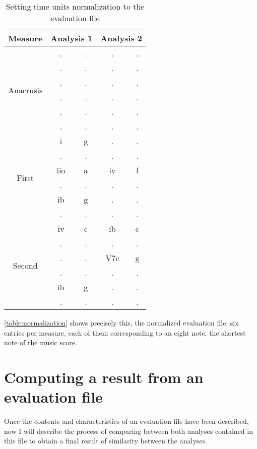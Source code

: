 		\begin{table}[tbp]
		\centering
		\begin{tabular}{|c|c|c|c|c|}
		\hline
		Measure & \multicolumn{2}{c|}{Analysis 1} & \multicolumn{2}{c|}{Analysis 2} \\ \hline
		\multirow{6}{*}{Anacrusis} & . & . & . & . \\ \cline{2-5}
		 & . & . & . & . \\ \cline{2-5}
		 & . & . & . & . \\ \cline{2-5}
		 & . & . & . & . \\ \cline{2-5}
		 & . & . & . & . \\ \cline{2-5}
		 & . & . & . & . \\ \hline
		\multirow{6}{*}{First} & i & g & . & . \\ \cline{2-5}
		 & . & . & . & . \\ \cline{2-5}
		 & iio & a & iv & f \\ \cline{2-5}
		 & . & . & . & . \\ \cline{2-5}
		 & ib & g & . & . \\ \cline{2-5}
		 & . & . & . & . \\ \hline
		\multirow{6}{*}{Second} & iv & c & ib & c \\ \cline{2-5}
		 & . & . & . & . \\ \cline{2-5}
		 & . & . & V7c & g \\ \cline{2-5}
		 & . & . & . & . \\ \cline{2-5}
		 & ib & g & . & . \\ \cline{2-5}
		 & . & . & . & . \\ \hline
		\end{tabular}
		\caption{Setting time units normalization to the evaluation file}
		\label{table:normalization}
		\end{table}

		\autoref{table:normalization} shows precisely this, the normalized evaluation file, six entries per measure, each of them corresponding to an eight note, the shortest note of the music score.

\section{Computing a result from an evaluation file}
	Once the contents and characteristics of an evaluation file have been described, now I will describe the process of comparing between both analyses contained in this file to obtain a final result of similarity between the analyses.

